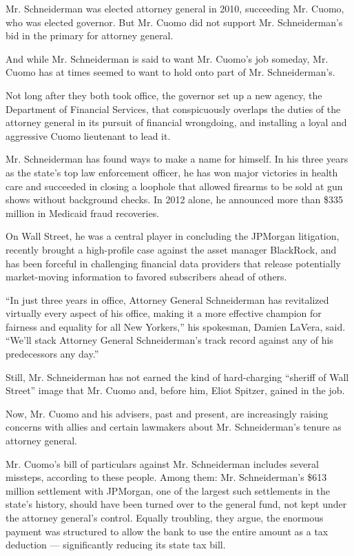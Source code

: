 Mr. Schneiderman was elected attorney general in 2010, succeeding Mr.
Cuomo, who was elected governor. But Mr. Cuomo did not support Mr.
Schneiderman's bid in the primary for attorney general.

And while Mr. Schneiderman is said to want Mr. Cuomo's job someday, Mr.
Cuomo has at times seemed to want to hold onto part of Mr.
Schneiderman's.

Not long after they both took office, the governor set up a new agency,
the Department of Financial Services, that conspicuously overlaps the
duties of the attorney general in its pursuit of financial wrongdoing,
and installing a loyal and aggressive Cuomo lieutenant to lead it.

Mr. Schneiderman has found ways to make a name for himself. In his three
years as the state's top law enforcement officer, he has won major
victories in health care and succeeded in closing a loophole that
allowed firearms to be sold at gun shows without background checks. In
2012 alone, he announced more than \$335 million in Medicaid fraud
recoveries.

On Wall Street, he was a central player in concluding the JPMorgan
litigation, recently brought a high-profile case against the asset
manager BlackRock, and has been forceful in challenging financial data
providers that release potentially market-moving information to favored
subscribers ahead of others.

``In just three years in office, Attorney General Schneiderman has
revitalized virtually every aspect of his office, making it a more
effective champion for fairness and equality for all New Yorkers,'' his
spokesman, Damien LaVera, said. ``We'll stack Attorney General
Schneiderman's track record against any of his predecessors any day.''

Still, Mr. Schneiderman has not earned the kind of hard-charging
``sheriff of Wall Street'' image that Mr. Cuomo and, before him, Eliot
Spitzer, gained in the job.

Now, Mr. Cuomo and his advisers, past and present, are increasingly
raising concerns with allies and certain lawmakers about Mr.
Schneiderman's tenure as attorney general.

Mr. Cuomo's bill of particulars against Mr. Schneiderman includes
several missteps, according to these people. Among them: Mr.
Schneiderman's \$613 million settlement with JPMorgan, one of the
largest such settlements in the state's history, should have been turned
over to the general fund, not kept under the attorney general's control.
Equally troubling, they argue, the enormous payment was structured to
allow the bank to use the entire amount as a tax deduction ---
significantly reducing its state tax bill.

